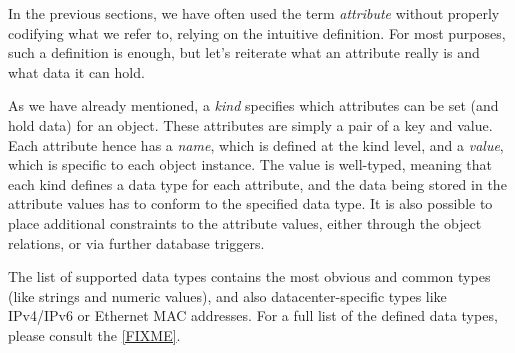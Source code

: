 \documentclass{article}
\begin{document}
In the previous sections, we have often used the term {\em attribute} without properly codifying what we refer to,
relying on the intuitive definition.  For most purposes, such a definition is enough, but let's reiterate what an
attribute really is and what data it can hold.

As we have already mentioned, a {\em kind} specifies which attributes can be set (and hold data) for an object.  These
attributes are simply a pair of a key and value.  Each attribute hence has a {\em name}, which is defined at the kind
level, and a {\em value}, which is specific to each object instance.  The value is well-typed, meaning that each kind
defines a data type for each attribute, and the data being stored in the attribute values has to conform to the
specified data type.  It is also possible to place additional constraints to the attribute values, either through the
object relations, or via further database triggers.

The list of supported data types contains the most obvious and common types (like strings and numeric values), and also
datacenter-specific types like IPv4/IPv6 or Ethernet MAC addresses.  For a full list of the defined data types, please
consult the \ref{FIXME}.
\end{document}
